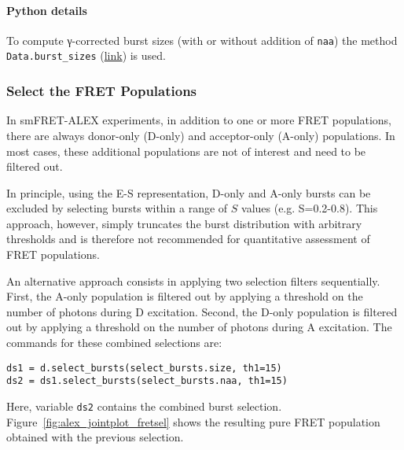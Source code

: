 \paragraph{Python details} 
To compute γ-corrected burst sizes (with or without addition of \verb|naa|) 
the method \verb|Data.burst_sizes|
(\href{http://fretbursts.readthedocs.org/en/latest/data_class.html#fretbursts.burstlib.Data.burst_sizes}{link})
is used.

\subsubsection{Select the FRET Populations}

In smFRET-ALEX experiments, in addition to one or more FRET populations, there are always
donor-only (D-only) and acceptor-only (A-only) populations.
In most cases, these additional populations are not of interest and need to be filtered out.

In principle, using the E-S representation, D-only and A-only bursts
can be excluded by selecting bursts within a range of $S$ values (e.g. S=0.2-0.8). 
This approach, however, simply truncates the burst distribution with arbitrary
thresholds and is therefore not recommended for quantitative assessment of FRET
populations.

An alternative approach consists in applying two selection filters sequentially.
First, the A-only population is filtered out
by applying a threshold on the number of photons during D excitation.
Second, the D-only population is filtered out by applying a threshold on 
the number of photons during A excitation.
The commands for these combined selections are:

\begin{lstlisting}
ds1 = d.select_bursts(select_bursts.size, th1=15)
ds2 = ds1.select_bursts(select_bursts.naa, th1=15)
\end{lstlisting}

Here, variable \verb|ds2| contains the combined burst selection.
Figure~\ref{fig:alex_jointplot_fretsel} shows the resulting pure FRET
population obtained with the previous selection.
